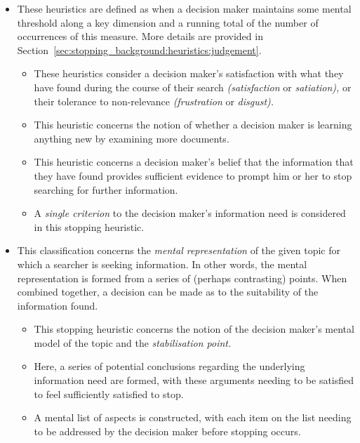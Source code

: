\begin{itemize}
    \item{ These heuristics are defined as when a decision maker maintains some mental threshold along a key dimension and a running total of the number of occurrences of this measure. More details are provided in Section~\ref{sec:stopping_background:heuristics:judgement}.}
    \begin{itemize}
        \item{ These heuristics consider a decision maker's satisfaction with what they have found during the course of their search \emph{(satisfaction} or \emph{satiation),} or their tolerance to non-relevance \emph{(frustration} or \emph{disgust).}}
        \item{ This heuristic concerns the notion of whether a decision maker is learning anything new by examining more documents.}
        \item{ This heuristic concerns a decision maker's belief that the information that they have found provides sufficient evidence to prompt him or her to stop searching for further information.}
        \item{ A \emph{single criterion} to the decision maker's information need is considered in this stopping heuristic.}
    \end{itemize}
    
    \item{ This classification concerns the \emph{mental representation} of the given topic for which a searcher is seeking information. In other words, the mental representation is formed from a series of (perhaps contrasting) points. When combined together, a decision can be made as to the suitability of the information found.}
    \begin{itemize}
        \item{ This stopping heuristic concerns the notion of the decision maker's mental model of the topic and the \emph{stabilisation point.}}
        \item{ Here, a series of potential conclusions regarding the underlying information need are formed, with these arguments needing to be satisfied to feel sufficiently satisfied to stop.}
        \item{ A mental list of aspects is constructed, with each item on the list needing to be addressed by the decision maker before stopping occurs.}
    \end{itemize}
\end{itemize}

